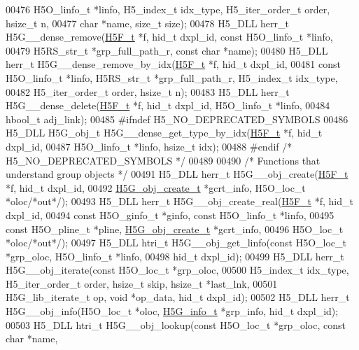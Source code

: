 \begin{DoxyCode}
00476     H5O\_linfo\_t *linfo, H5\_index\_t idx\_type, H5\_iter\_order\_t order, hsize\_t n,
00477     \textcolor{keywordtype}{char} *name, \textcolor{keywordtype}{size\_t} size);
00478 H5\_DLL herr\_t H5G\_\_dense\_remove(\hyperlink{struct_h5_f__t}{H5F\_t} *f, hid\_t dxpl\_id, \textcolor{keyword}{const} H5O\_linfo\_t *linfo,
00479     H5RS\_str\_t *grp\_full\_path\_r, \textcolor{keyword}{const} \textcolor{keywordtype}{char} *name);
00480 H5\_DLL herr\_t H5G\_\_dense\_remove\_by\_idx(\hyperlink{struct_h5_f__t}{H5F\_t} *f, hid\_t dxpl\_id,
00481     \textcolor{keyword}{const} H5O\_linfo\_t *linfo, H5RS\_str\_t *grp\_full\_path\_r, H5\_index\_t idx\_type,
00482     H5\_iter\_order\_t order, hsize\_t n);
00483 H5\_DLL herr\_t H5G\_\_dense\_delete(\hyperlink{struct_h5_f__t}{H5F\_t} *f, hid\_t dxpl\_id, H5O\_linfo\_t *linfo,
00484     hbool\_t adj\_link);
00485 \textcolor{preprocessor}{#ifndef H5\_NO\_DEPRECATED\_SYMBOLS}
00486 H5\_DLL H5G\_obj\_t H5G\_\_dense\_get\_type\_by\_idx(\hyperlink{struct_h5_f__t}{H5F\_t}  *f, hid\_t dxpl\_id,
00487     H5O\_linfo\_t *linfo, hsize\_t idx);
00488 \textcolor{preprocessor}{#endif }\textcolor{comment}{/* H5\_NO\_DEPRECATED\_SYMBOLS */}\textcolor{preprocessor}{}
00489 
00490 \textcolor{comment}{/* Functions that understand group objects */}
00491 H5\_DLL herr\_t H5G\_\_obj\_create(\hyperlink{struct_h5_f__t}{H5F\_t} *f, hid\_t dxpl\_id,
00492     \hyperlink{struct_h5_g__obj__create__t}{H5G\_obj\_create\_t} *gcrt\_info, H5O\_loc\_t *oloc\textcolor{comment}{/*out*/});
00493 H5\_DLL herr\_t H5G\_\_obj\_create\_real(\hyperlink{struct_h5_f__t}{H5F\_t} *f, hid\_t dxpl\_id,
00494     \textcolor{keyword}{const} H5O\_ginfo\_t *ginfo, \textcolor{keyword}{const} H5O\_linfo\_t *linfo,
00495     \textcolor{keyword}{const} H5O\_pline\_t *pline, \hyperlink{struct_h5_g__obj__create__t}{H5G\_obj\_create\_t} *gcrt\_info,
00496     H5O\_loc\_t *oloc\textcolor{comment}{/*out*/});
00497 H5\_DLL htri\_t H5G\_\_obj\_get\_linfo(\textcolor{keyword}{const} H5O\_loc\_t *grp\_oloc, H5O\_linfo\_t *linfo,
00498     hid\_t dxpl\_id);
00499 H5\_DLL herr\_t H5G\_\_obj\_iterate(\textcolor{keyword}{const} H5O\_loc\_t *grp\_oloc,
00500     H5\_index\_t idx\_type, H5\_iter\_order\_t order, hsize\_t skip, hsize\_t *last\_lnk,
00501     H5G\_lib\_iterate\_t op, \textcolor{keywordtype}{void} *op\_data, hid\_t dxpl\_id);
00502 H5\_DLL herr\_t H5G\_\_obj\_info(H5O\_loc\_t *oloc, \hyperlink{struct_h5_g__info__t}{H5G\_info\_t} *grp\_info, hid\_t dxpl\_id);
00503 H5\_DLL htri\_t H5G\_\_obj\_lookup(\textcolor{keyword}{const} H5O\_loc\_t *grp\_oloc, \textcolor{keyword}{const} \textcolor{keywordtype}{char} *name,

\end{DoxyCode}
